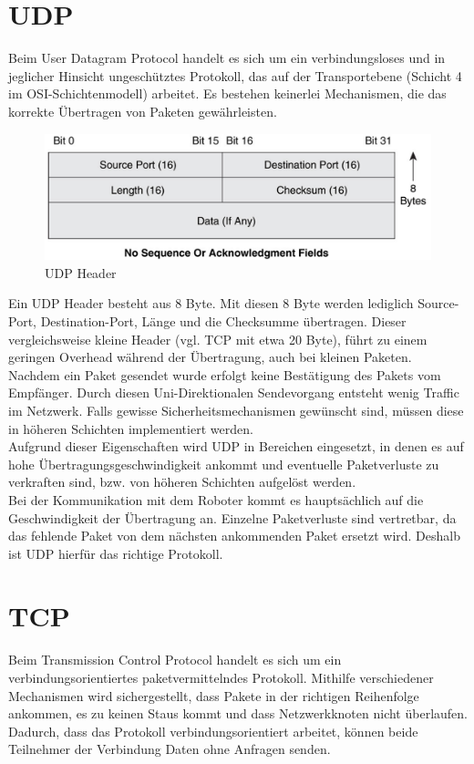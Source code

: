 \section{UDP}
Beim User Datagram Protocol handelt es sich um ein verbindungsloses und in jeglicher Hinsicht ungeschütztes Protokoll, das auf der Transportebene (Schicht 4 im OSI-Schichtenmodell) arbeitet. Es bestehen keinerlei Mechanismen, die das korrekte Übertragen von Paketen gewährleisten. 

\begin{figure}[h]
\includegraphics[width=\textwidth]{images/UDP_header.pdf}
\caption{UDP Header}
\label{fig:udp_header}
\end{figure}

Ein UDP Header besteht aus 8 Byte. Mit diesen 8 Byte werden lediglich Source-Port, Destination-Port, Länge und die Checksumme übertragen. Dieser vergleichsweise kleine Header (vgl. TCP mit etwa 20 Byte), führt zu einem geringen Overhead während der Übertragung, auch bei kleinen Paketen. Nachdem ein Paket gesendet wurde erfolgt keine Bestätigung des Pakets vom Empfänger. Durch diesen Uni-Direktionalen Sendevorgang entsteht wenig Traffic im Netzwerk. Falls gewisse Sicherheitsmechanismen gewünscht sind, müssen diese in höheren Schichten implementiert werden. \\
Aufgrund dieser Eigenschaften wird UDP in Bereichen eingesetzt, in denen es auf hohe Übertragungsgeschwindigkeit ankommt und eventuelle Paketverluste zu verkraften sind, bzw. von höheren Schichten aufgelöst werden.\\

Bei der Kommunikation mit dem Roboter kommt es hauptsächlich auf die Geschwindigkeit der Übertragung an. Einzelne Paketverluste sind vertretbar, da das fehlende Paket von dem nächsten ankommenden Paket ersetzt wird. Deshalb ist UDP hierfür das richtige Protokoll.


\section{TCP}
Beim Transmission Control Protocol handelt es sich um ein verbindungsorientiertes paketvermittelndes Protokoll. Mithilfe verschiedener Mechanismen wird sichergestellt, dass Pakete in der richtigen Reihenfolge ankommen, es zu keinen Staus kommt und dass Netzwerkknoten nicht überlaufen. Dadurch, dass das Protokoll verbindungsorientiert arbeitet, können beide Teilnehmer der Verbindung Daten ohne Anfragen senden. 

